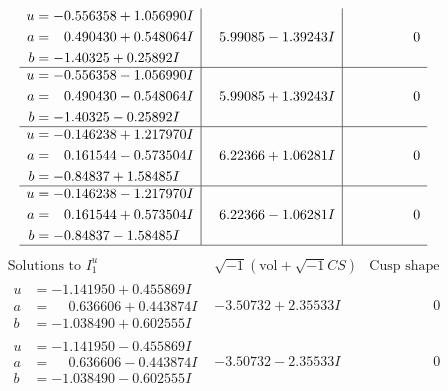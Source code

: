 \documentclass[1p]{elsarticle_modified}
\theoremstyle{definition}
\newcommand{\I}{\sqrt{-1}}
\begin{document}
$$\begin{array}{c|c|c}
\begin{aligned}
u &= -0.556358 + 1.056990 I \\
a &= \phantom{-}0.490430 + 0.548064 I \\
b &= -1.40325 + 0.25892 I\end{aligned}
 & \phantom{-}5.99085 - 1.39243 I & \phantom{-0.000000 } 0 \\ \hline\begin{aligned}
u &= -0.556358 - 1.056990 I \\
a &= \phantom{-}0.490430 - 0.548064 I \\
b &= -1.40325 - 0.25892 I\end{aligned}
 & \phantom{-}5.99085 + 1.39243 I & \phantom{-0.000000 } 0 \\ \hline\begin{aligned}
u &= -0.146238 + 1.217970 I \\
a &= \phantom{-}0.161544 - 0.573504 I \\
b &= -0.84837 + 1.58485 I\end{aligned}
 & \phantom{-}6.22366 + 1.06281 I & \phantom{-0.000000 } 0 \\ \hline\begin{aligned}
u &= -0.146238 - 1.217970 I \\
a &= \phantom{-}0.161544 + 0.573504 I \\
b &= -0.84837 - 1.58485 I\end{aligned}
 & \phantom{-}6.22366 - 1.06281 I & \phantom{-0.000000 } 0\\
 \hline 
 \end{array}$$\newpage$$\begin{array}{c|c|c}  
\text{Solutions to }I^u_{1}& \I (\text{vol} + \sqrt{-1}CS) & \text{Cusp shape}\\
 \hline 
\begin{aligned}
u &= -1.141950 + 0.455869 I \\
a &= \phantom{-}0.636606 + 0.443874 I \\
b &= -1.038490 + 0.602555 I\end{aligned}
 & -3.50732 + 2.35533 I & \phantom{-0.000000 } 0 \\ \hline\begin{aligned}
u &= -1.141950 - 0.455869 I \\
a &= \phantom{-}0.636606 - 0.443874 I \\
b &= -1.038490 - 0.602555 I\end{aligned}
 & -3.50732 - 2.35533 I & \phantom{-0.000000 } 0 \\ \hline\begin{aligned}

\end{aligned}
\end{array}$$
\end{document}
